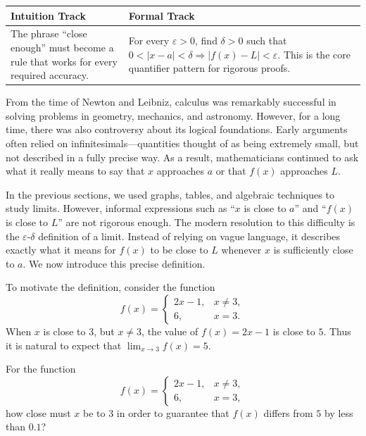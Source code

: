 \begin{center}
\renewcommand{\arraystretch}{1.2}
\begin{tabular}{|p{}|p{}|}
\hline
\textbf{Intuition Track} & \textbf{Formal Track} \\
\hline
The phrase ``close enough'' must become a rule that works for every required accuracy. & For every \(\varepsilon>0\), find \(\delta>0\) such that \(0<|x-a|<\delta \Rightarrow |f(x)-L|<\varepsilon\). This is the core quantifier pattern for rigorous proofs. \\
\hline
\end{tabular}
\end{center}

From the time of Newton and Leibniz, calculus was remarkably successful in solving problems in geometry, mechanics, and astronomy. However, for a long time, there was also controversy about its logical foundations. Early arguments often relied on infinitesimals---quantities thought of as being extremely small, but not described in a fully precise way. As a result, mathematicians continued to ask what it really means to say that \(x\) approaches \(a\) or that \(f(x)\) approaches \(L\).

In the previous sections, we used graphs, tables, and algebraic techniques to study limits. However, informal expressions such as ``\(x\) is close to \(a\)'' and ``\(f(x)\) is close to \(L\)'' are not rigorous enough. The modern resolution to this difficulty is the \(\varepsilon\)-\(\delta\) definition of a limit. Instead of relying on vague language, it describes exactly what it means for \(f(x)\) to be close to \(L\) whenever \(x\) is sufficiently close to \(a\). We now introduce this precise definition.

To motivate the definition, consider the function
\[
f(x)=
\begin{cases}
2x-1, & x\ne 3,\\[4pt]
6, & x=3.
\end{cases}
\]
When \(x\) is close to \(3\), but \(x\ne 3\), the value of \(f(x)=2x-1\) is close to \(5\). Thus it is natural to expect that
\(\displaystyle
\lim_{x\to 3} f(x)=5.
\)

\begin{example}
For the function
\[
f(x)=
\begin{cases}
2x-1, & x\ne 3,\\[4pt]
6, & x=3,
\end{cases}
\]
how close must \(x\) be to \(3\) in order to guarantee that \(f(x)\) differs from \(5\) by less than \(0.1\)?
\end{example}

